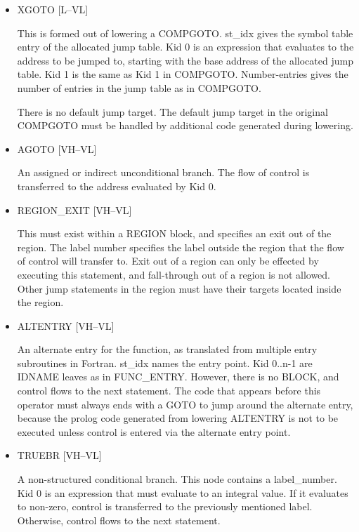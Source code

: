 \documentclass{article}
\begin{document}
\begin{itemize}
\item
{}%
XGOTO [L--VL]

This is formed out of lowering a
%
COMPGOTO. st\_idx gives the symbol
table entry of the allocated jump table. Kid 0 is an expression
that evaluates
to the address to be jumped to, starting with the base address of
the allocated jump table. Kid 1 is the same as Kid 1 in
%
COMPGOTO. Number-entries gives the number of entries in the jump
table as in
%
COMPGOTO.


There is no default jump target. The default jump target in the
original
%
COMPGOTO must be handled by additional code generated
during lowering.

\item
{}%
AGOTO \hfill [VH--VL]

An assigned or indirect unconditional branch. The flow of control
is transferred to the address evaluated by Kid 0.

\item
{}%
REGION\_EXIT \hfill [VH--VL]

This must exist within a
%
REGION block, and specifies an exit out
of the region. The label number specifies the label outside the
region that the
flow of control will transfer to. Exit out of a region can only be
effected by executing this statement, and fall-through out of a
region is not allowed. Other jump statements in the region must
have their targets located inside the region.

\item
{}%
ALTENTRY \hfill [VH--VL]

An alternate entry for the function, as translated from multiple
entry subroutines in Fortran. st\_idx names the entry point. Kid
0..n-1 are
%
IDNAME leaves as in 
%
FUNC\_ENTRY. However, there is no
%
BLOCK, and
control flows to the next statement. The code that appears before
this operator
must always ends with a
%
GOTO to jump around the alternate entry,
because the prolog code generated from lowering
%
ALTENTRY is not to be executed unless control is entered via the
alternate entry point.

\item
{}%
TRUEBR \hfill [VH--VL]

A non-structured conditional branch. This node contains a
label\_number. Kid 0 is an expression that must evaluate to an integral
value. If it evaluates to non-zero, control is transferred to the
previously mentioned label. Otherwise, control flows to the next
statement.


\end{itemize}
\end{document}
